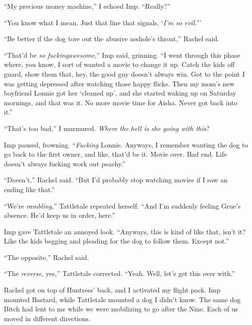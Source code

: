 ``My precious money machine,'' I echoed Imp.  ``Really?''



``You know what I mean.  Just that line that signals, `\emph{I'm so evil.'}''



``Be better if the dog tore out the abusive asshole's throat,'' Rachel said.



``That'd be \emph{so fucking}\emph{awesome},'' Imp said, grinning.  ``I went through this phase where, you know, I sort of wanted a movie to change it up.  Catch the kids off guard, show them that, hey, the good guy doesn't always win.  Got to the point I was getting depressed after watching those happy flicks.  Then my mom's new boyfriend Lonnie got her `cleaned up', and she started waking up on Saturday mornings, and that was it.  No more movie time for Aisha.  Never got back into it.''



``That's too bad,'' I murmured.  \emph{Where the hell is she going with this}?



Imp paused, frowning.  ``\emph{Fucking} Lonnie.  Anyways, I remember wanting the dog to go back to the first owner, and like, that'd be it.  Movie over.  Bad end.  Life doesn't always fucking work out peachy.''



``Doesn't,'' Rachel said.  ``But I'd probably stop watching movies if I saw an ending like that.''



``We're \emph{rambling},'' Tattletale repeated herself.  ``And I'm suddenly feeling Grue's absence.  He'd keep us in order, here.''



Imp gave Tattletale an annoyed look.  ``Anyways, this is kind of like that, isn't it?  Like the kids begging and pleading for the dog to follow them.  Except not.''



``The opposite,'' Rachel said.



``The \emph{reverse}, yes,'' Tattletale corrected.  ``Yeah.  Well, let's get this over with.''



Rachel got on top of Huntress' back, and I activated my flight pack.  Imp mounted Bastard, while Tattletale mounted a dog I didn't know.  The same dog Bitch had lent to me while we were mobilizing to go after the Nine.  Each of us moved in different directions.



